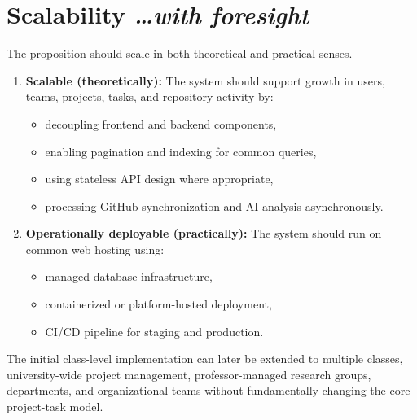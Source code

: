 \documentclass[11pt,a4paper]{article}
\newcommand{\BvrHint}[1]{%
  \texorpdfstring{%
    {\normalfont\normalsize\itshape\hfill #1}%
  }{}%
}
\begin{document}
\section{Scalability%
  \BvrHint{\ldots with foresight}}

The proposition should scale in both theoretical and practical senses.

\begin{enumerate}[leftmargin=0.7cm]

    \item \textbf{Scalable (theoretically):} The system should support growth in users, teams, projects, tasks, and repository activity by:

    \begin{itemize}[leftmargin=0.7cm]

        \item decoupling frontend and backend components,

        \item enabling pagination and indexing for common queries,

        \item using stateless API design where appropriate,

        \item processing GitHub synchronization and AI analysis asynchronously.

    \end{itemize}


    \item \textbf{Operationally deployable (practically):} The system should run on common web hosting using:

    \begin{itemize}[leftmargin=0.7cm]

        \item managed database infrastructure,

        \item containerized or platform-hosted deployment,

        \item CI/CD pipeline for staging and production.

    \end{itemize}

\end{enumerate}

The initial class-level implementation can later be extended to multiple classes, university-wide project management, professor-managed research groups, departments, and organizational teams without fundamentally changing the core project-task model.
\end{document}
